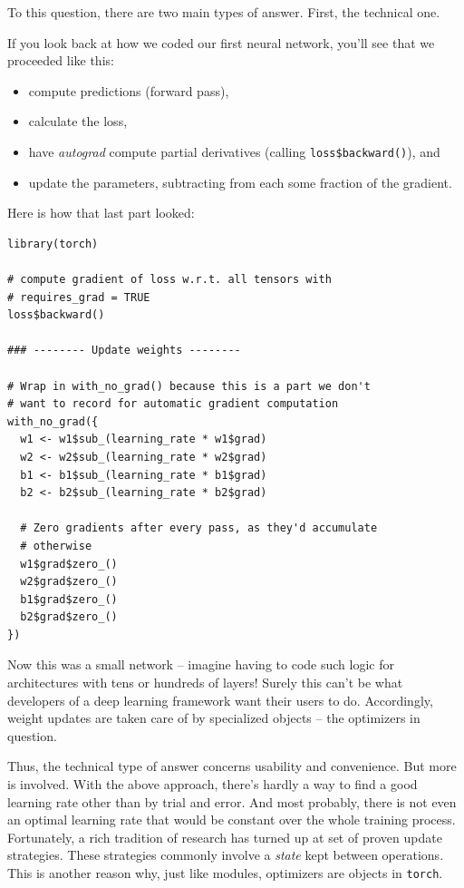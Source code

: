 \documentclass[
  letterpaper,
]{krantz}
\begin{document}
To this question, there are two main types of answer. First, the
technical one.

If you look back at how we coded our first neural network, you'll see
that we proceeded like this:

\begin{itemize}
\item
  compute predictions (forward pass),
\item
  calculate the loss,
\item
  have \emph{autograd} compute partial derivatives (calling
  \texttt{loss\$backward()}), and
\item
  update the parameters, subtracting from each some fraction of the
  gradient.
\end{itemize}

Here is how that last part looked:

\begin{verbatim}
library(torch)

# compute gradient of loss w.r.t. all tensors with
# requires_grad = TRUE
loss$backward()
  
### -------- Update weights -------- 
  
# Wrap in with_no_grad() because this is a part we don't 
# want to record for automatic gradient computation
with_no_grad({
  w1 <- w1$sub_(learning_rate * w1$grad)
  w2 <- w2$sub_(learning_rate * w2$grad)
  b1 <- b1$sub_(learning_rate * b1$grad)
  b2 <- b2$sub_(learning_rate * b2$grad)  
     
  # Zero gradients after every pass, as they'd accumulate
  # otherwise
  w1$grad$zero_()
  w2$grad$zero_()
  b1$grad$zero_()
  b2$grad$zero_()  
})
\end{verbatim}

Now this was a small network -- imagine having to code such logic for
architectures with tens or hundreds of layers! Surely this can't be what
developers of a deep learning framework want their users to do.
Accordingly, weight updates are taken care of by specialized objects --
the optimizers in question.

Thus, the technical type of answer concerns usability and convenience.
But more is involved. With the above approach, there's hardly a way to
find a good learning rate other than by trial and error. And most
probably, there is not even an optimal learning rate that would be
constant over the whole training process. Fortunately, a rich tradition
of research has turned up at set of proven update strategies. These
strategies commonly involve a \emph{state} kept between operations. This
is another reason why, just like modules, optimizers are objects in
\texttt{torch}.
\end{document}
